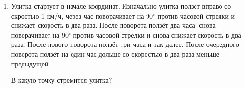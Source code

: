 \documentclass[12pt]{article}
\theoremstyle{definition}
\begin{document}
{\begin{enumerate}
  \begin{minipage}{\linewidth}
    \begin{multicols}{3}
      \begin{enumerate}    
      \item $z^2 = -1$; 
      \item $z^2 = i$; 
      \item $z^2 = 1 + i$; 
      \item $z^3 = 1$;
      \item $z^6 = -1$;
      \item $z^4 = -i$;
    \end{enumerate}
  \end{multicols}
  \end{minipage}
  \item Улитка стартует в начале координат. 
  Изначально улитка ползёт вправо со скростью 1 км/ч, через час поворачивает на 90$^{\circ}$ против часовой стрелки 
  и снижает скорость в два раза. После поворота ползёт два часа, снова поворачивает на  90$^{\circ}$ против часовой стрелки и
  снова снижает скорость в два раза. После нового поворота ползёт три часа и так далее. 
  После очередного поворота ползёт на один час дольше со скоростью в два раза меньше предыдущей. 

  В какую точку стремится улитка?
  

\end{enumerate}
}
\end{document}
